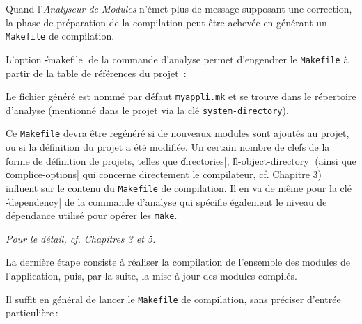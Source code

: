 
Quand l'{\em Analyseur de Modules} n'\'{e}met plus de message supposant
une correction, la phase de pr\'{e}paration de la compilation peut \^{e}tre
achev\'{e}e en g\'{e}n\'{e}rant un {\tt Makefile} de compilation.

L'option \|-makefile| de la commande d'analyse permet d'engendrer
le {\tt Makefile} \`{a} partir de la table de r\'{e}f\'{e}rences du projet \,:

\begin{Code*}
\end{Code*}

Le fichier g\'{e}n\'{e}r\'{e} est nomm\'{e} par d\'{e}faut {\tt myappli.mk}
et se trouve dans le r\'{e}pertoire d'analyse 
(mentionn\'{e} dans le projet via la cl\'{e} {\tt system-directory}).


Ce {\tt Makefile} devra 
\^{e}tre reg\'{e}n\'{e}r\'{e} si de nouveaux modules sont ajout\'{e}s au projet, ou
si la d\'{e}finition du projet a \'{e}t\'{e} modifi\'{e}e.
Un certain nombre de clefs de la forme de d\'{e}finition de projets,
telles que \|directories|, \|ll-object-directory| (ainsi que
\|complice-options| qui concerne directement le compilateur,
cf. Chapitre 3) influent sur le contenu du {\tt Makefile}
de compilation.
Il en va de m\^{e}me pour la cl\'{e} \|-dependency| de la commande d'analyse
qui sp\'{e}cifie \'{e}galement le niveau de d\'{e}pendance utilis\'{e}
pour op\'{e}rer les {\tt make}.

\medskip 

{\em Pour le d\'{e}tail, cf. Chapitres 3 et 5.}



La derni\`{e}re \'{e}tape consiste \`{a} r\'{e}aliser la compilation de l'ensemble
des modules de l'application, puis, par la suite, la mise \`{a} jour
des modules compil\'{e}s.

Il suffit en g\'{e}n\'{e}ral de lancer le {\tt Makefile} de compilation,
sans pr\'{e}ciser d'entr\'{e}e  particuli\`{e}re\,:
\begin{Code*}
\end{Code*}

